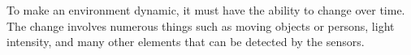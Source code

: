 To make an environment dynamic, it must have the ability to change over time. The change involves numerous things such as moving objects or persons, light intensity, and many other elements that can be detected by the sensors.